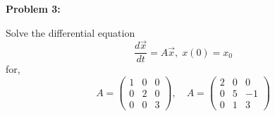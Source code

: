 \documentclass[12pt]{article}
\newenvironment{problem}[1]{
    \textbf{Problem #1:}
}{
    \rmfamily \vspace{2em}
}
\begin{document}
\newpage

\begin{problem}{3}
    Solve the differential equation
    \[
        \frac{d\vec{x}}{dt} = A\vec{x}, \; x(0) = x_0
    \]
    for,
    \[
        A = \begin{pmatrix}
            1 & 0 & 0 \\
            0 & 2 & 0 \\
            0 & 0 & 3
        \end{pmatrix}, \quad A = \begin{pmatrix}
            2 & 0 & 0 \\
            0 & 5 & -1 \\
            0 & 1 & 3
        \end{pmatrix}
    \]
\end{problem}
\end{document}
